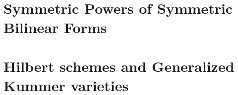 \documentclass[letterpaper]{amsart}
\begin{document}








\newpage

\tableofcontents

\pagebreak
{} 



\newpage
\part{Symmetric Powers of Symmetric Bilinear Forms}

\newpage
\part{Hilbert schemes and Generalized Kummer varieties}






\label{integralcohomology}





\newpage
\end{document}
